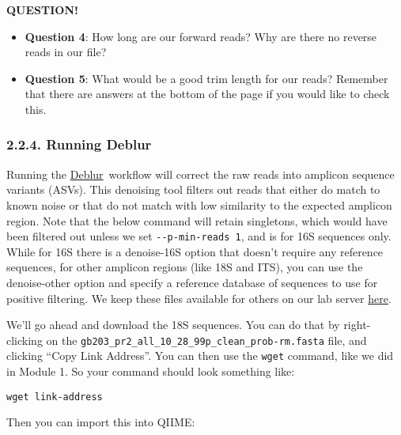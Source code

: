\documentclass[
]{book}
\providecommand{\tightlist}{%
  \setlength{\itemsep}{0pt}\setlength{\parskip}{0pt}}
\newenvironment{bluebox}{
  \definecolor{shadecolor}{RGB}{172, 210, 237}
  \color{white}
  \begin{shaded}}
 {\end{shaded}}
\begin{document}
\begin{bluebox}

\begin{center}
\textbf{QUESTION!}

\end{center}

\begin{itemize}
\tightlist
\item
  \textbf{Question 4}: How long are our forward reads? Why are there no reverse reads in our file?
\item
  \textbf{Question 5}: What would be a good trim length for our reads? Remember that there are answers at the bottom of the page if you would like to check this.
\end{itemize}

\end{bluebox}

\subsubsection{2.2.4. Running Deblur}\label{running-deblur-1}

Running the \href{https://github.com/biocore/deblur}{Deblur}~workflow will correct the raw reads into amplicon sequence variants (ASVs). This denoising tool filters out reads that either do match to known noise or that do not match with low similarity to the expected amplicon region. Note that the below command will retain singletons, which would have been filtered out unless we set \texttt{-\/-p-min-reads\ 1}, and is for 16S sequences only. While for 16S there is a denoise-16S option that doesn't require any reference sequences, for other amplicon regions (like 18S and ITS), you can use the denoise-other option and specify a reference database of sequences to use for positive filtering. We keep these files available for others on our lab server \href{http://kronos.pharmacology.dal.ca/public_files/MH/deblur_non16S_ref/}{here}.

We'll go ahead and download the 18S sequences. You can do that by right-clicking on the \texttt{gb203\_pr2\_all\_10\_28\_99p\_clean\_prob-rm.fasta} file, and clicking ``Copy Link Address''. You can then use the \texttt{wget} command, like we did in Module 1. So your command should look something like:

\begin{verbatim}
wget link-address
\end{verbatim}

Then you can import this into QIIME:
\end{document}
